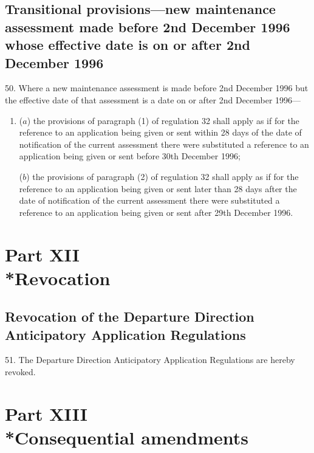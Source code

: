 \documentclass[a4paper]{article}
\newcommand{\parthead}{}
\begin{document}
\subsection[50. Transitional provisions—new maintenance assessment made before 2nd December 1996
whose effective date is on or after 2nd December 1996]{Transitional provisions—new maintenance assessment made before 2nd December 1996
whose effective date is on or after 2nd December 1996}

50. Where a new maintenance
assessment is made before 2nd December 1996 but the effective date of that
assessment is a date on or after 2nd December 1996—
\begin{enumerate}\item[]
($a$) the provisions of paragraph (1) of regulation 32 shall apply as if for the
reference to an application being given or sent within 28 days of the date of
notification of the current assessment there were substituted a reference to an
application being given or sent before 30th December 1996;

($b$) the provisions of paragraph (2) of regulation 32 shall apply as if for the
reference to an application being given or sent later than 28 days after the
date of notification of the current assessment there were substituted a
reference to an application being given or sent after 29th December 1996.
\end{enumerate}

\section[Part XII --- Revocation]{Part XII\\*Revocation}

\renewcommand\parthead{--- Part XII}

\subsection[51. Revocation of the Departure Direction Anticipatory Application
Regulations]{Revocation of the Departure Direction Anticipatory Application
Regulations}

51. The Departure Direction Anticipatory Application Regulations are
hereby revoked.

\section[Part XIII --- Consequential amendments]{Part XIII\\*Consequential amendments}
\end{document}
